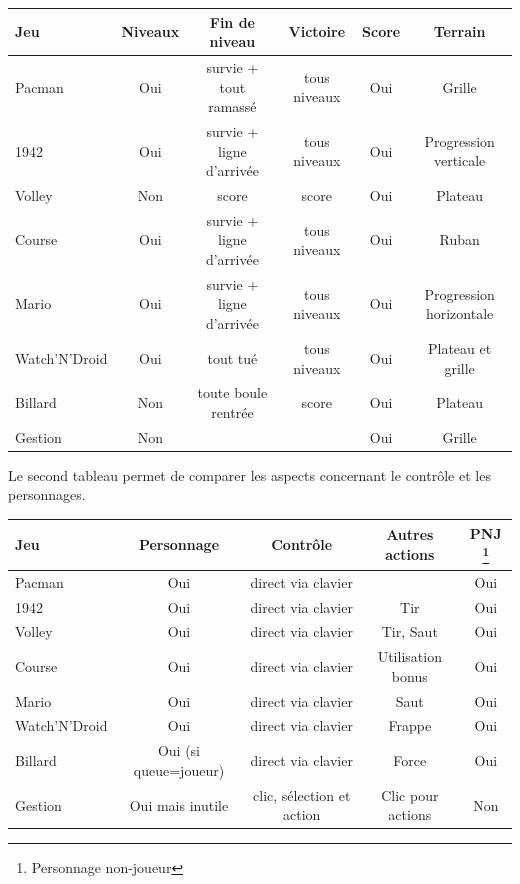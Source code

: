 \vspace{0.5cm}
\noindent
\begin{tabular}{|l|| c|c|c|c|c|}
\hline
 Jeu &  Niveaux & Fin de niveau & Victoire & Score & Terrain \\
\hline
 Pacman & Oui & survie + tout ramassé & tous niveaux & Oui & Grille \\
\hline
 1942 & Oui & survie + ligne d'arrivée & tous niveaux & Oui & Progression verticale \\
\hline
 Volley &  Non & score & score & Oui & Plateau \\
\hline
 Course & Oui & survie + ligne d'arrivée & tous niveaux & Oui & Ruban \\
\hline
 Mario & Oui & survie + ligne d'arrivée & tous niveaux & Oui & Progression horizontale\\
\hline
 Watch'N'Droid & Oui & tout tué & tous niveaux & Oui  & Plateau et grille\\
\hline
 Billard & Non & toute boule rentrée & score & Oui & Plateau \\
\hline
 Gestion & Non & & & Oui & Grille\\
\hline
\end{tabular}

\vspace{0.5cm}

Le second tableau permet de comparer les aspects concernant le contrôle et les personnages.

\vspace{0.5cm}
\noindent
\begin{tabular}{|l|| c|c|c|c|}
\hline
 Jeu & Personnage & Contrôle & Autres actions & PNJ \footnote{Personnage non-joueur} \\
\hline
 Pacman &  Oui & direct via clavier & &  Oui \\
\hline
 1942 & Oui & direct via clavier & Tir & Oui  \\
\hline
 Volley & Oui & direct via clavier  & Tir, Saut & Oui \\
\hline
 Course & Oui & direct via clavier & Utilisation bonus & Oui \\
\hline
 Mario & Oui & direct via clavier &  Saut & Oui \\
\hline
 Watch'N'Droid & Oui & direct via clavier & Frappe & Oui  \\
\hline 
 Billard &  Oui {\small (si queue=joueur)} & direct via clavier & Force & Oui  \\
\hline
 Gestion &  Oui mais inutile & clic, sélection et action & Clic pour actions & Non \\
\hline
\end{tabular}

